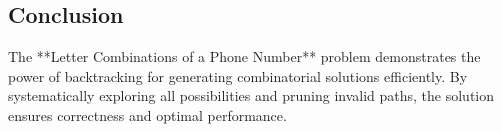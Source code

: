 \subsection*{Conclusion}
The **Letter Combinations of a Phone Number** problem demonstrates the power of backtracking for generating combinatorial solutions efficiently. By systematically exploring all possibilities and pruning invalid paths, the solution ensures correctness and optimal performance.